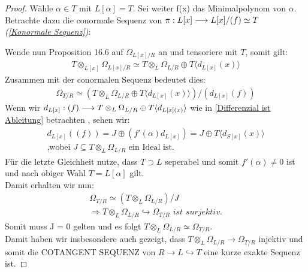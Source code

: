 \documentclass[10pt,a4paper]{report}
\newcommand{\functionfront}[3]{\nolinebreak{#1:#2 \longrightarrow #3}}
\newcommand{\divR}[2]{\Omega_{#1/#2}}
\newcommand{\divf}[1]{d_{#1}}
\newcommand{\Tensor}[3]{#1 \otimes_{#2} #3}
\newcommand{\tensor}[3]{#1 \otimes #3}
\newcommand{\Verz}[1]{\langle #1 \rangle}
\begin{document}
\begin{proof}
Wähle $\alpha \in T$ mit $L[\alpha] = T$. Sei weiter f(x) das Minimalpolynom von $\alpha$. Betrachte dazu die conormale Sequenz von  $\functionfront{\pi}{L[x]}{L[x]/(f) \simeq T}$ \textit{(\cref{Konormale Sequenz})}:
\begin{center}
\end{center}
Wende nun Proposition 16.6 auf $\divR{L[x]}{R}$ an und tensoriere mit $T$, somit gilt:
\begin{gather*}
\Tensor{T}{L[x]}{\divR{L[x]}{R}} \simeq \Tensor{T}{L}{\divR{L}{R}} \oplus T\langle \divf{L[x]}(x) \rangle
\end{gather*}
Zusammen mit der conormalen Sequenz bedeutet dies:
\begin{gather*}
\divR{T}{R} \simeq (\Tensor{T}{L}{\divR{L}{R}} \oplus T \Verz{\divf{L[x]}(x)})/(\divf{L[x]}(f))
\end{gather*}
Wenn wir $\functionfront{\divf{L[x]}}{(f)}{\Tensor{T}{L}{\divR{L}{R}} \oplus T \Verz{\divf{L[x](x)}}}$ wie in \cref{Differenzial ist Ableitung} betrachten , sehen wir:
\begin{gather*}
\divf{L[x]}((f)) = J \oplus (f'(\alpha)\divf{L[x]}) = J \oplus T \Verz{\divf{S[x]}(x)}\\
\text{,wobei $J \subseteq \Tensor{T}{L}{\divR{L}{R}}$ ein Ideal ist.}
\end{gather*}
Für die letzte Gleichheit nutze, dass $T \supset L$ seperabel und somit $f'(\alpha) \neq 0$ ist und nach obiger Wahl $T = L[\alpha]$ gilt.\\
Damit erhalten wir nun:
\begin{gather*}
\divR{T}{R} \simeq (\Tensor{T}{L}{\divR{L}{R}})/J \\
\Rightarrow \Tensor{T}{L}{\divR{L}{R}} \hookrightarrow \divR{T}{R} \textit{ ist surjektiv.}
\end{gather*}
Somit muss J = 0 gelten und es folgt $\Tensor{T}{L}{\divR{L}{R}} \simeq \divR{T}{R}$.\\
Damit haben wir insbesondere auch gezeigt, dass $\Tensor{T}{L}{\divR{L}{R}} \rightarrow \divR{T}{R}$ injektiv und somit die COTANGENT SEQUENZ von $R \rightarrow L \hookrightarrow T$ eine kurze exakte Sequenz ist.
\end{proof}
\end{document}
